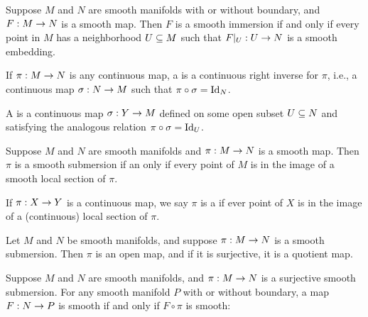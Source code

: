 \setcounter{thm}{24}

\begin{thm}
Suppose $M$ and $N$ are smooth manifolds with or without boundary, and $F:M\rightarrow N$ is a smooth map. Then $F$ is a smooth immersion if and only if every point in $M$ has a neighborhood $U\subseteq M$ such that $F|_U:U\rightarrow N$ is a smooth embedding.
\end{thm}

\dfn If $\pi:M\rightarrow N$ is any continuous map, a  is a continuous right inverse for $\pi$, i.e., a continuous map $\sigma:N\rightarrow M$ such that $\pi\circ \sigma = \text{Id}_N$.
\begin{center}
\end{center}
A  is a continuous map $\sigma:Y\rightarrow M$ defined on some open subset $U\subseteq N$ and satisfying the analogous relation $\pi\circ\sigma = \text{Id}_U$.

\begin{thm}
Suppose $M$ and $N$ are smooth manifolds and $\pi:M\rightarrow N$ is a smooth map. Then $\pi$ is a smooth submersion if an only if every point of $M$ is in the image of a smooth local section of $\pi$.
\end{thm}

\dfn If $\pi:X\rightarrow Y$ is a continuous map, we say $\pi$ is a  if ever point of $X$ is in the image of a (continuous) local section of $\pi$.

\setcounter{thm}{27}

\begin{thm}
Let $M$ and $N$ be smooth manifolds, and suppose $\pi:M\rightarrow N$ is a smooth submersion. Then $\pi$ is an open map, and if it is surjective, it is a quotient map.
\end{thm}

\begin{thm}
Suppose $M$ and $N$ are smooth manifolds, and $\pi:M\rightarrow N$ is a surjective smooth submersion. For any smooth manifold $P$ with or without boundary, a map $F:N\rightarrow P$ is smooth if and only if $F\circ \pi$ is smooth:
\begin{center}
\end{center}
\end{thm}

